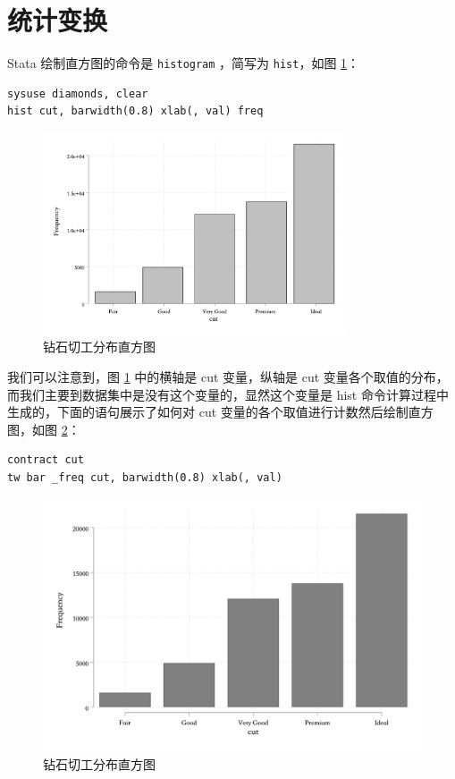 \section{统计变换}

Stata 绘制直方图的命令是 \texttt{histogram} ，简写为 \texttt{hist}，如图 \ref{fig:histcut}：

\begin{lstlisting}
sysuse diamonds, clear
hist cut, barwidth(0.8) xlab(, val) freq
\end{lstlisting}

\begin{figure}[htbp]
  \centering
  \includegraphics[width=0.8\textwidth]{assets/histcut.png}
  \caption{钻石切工分布直方图}\label{fig:histcut}
\end{figure}

我们可以注意到，图 \ref{fig:histcut} 中的横轴是 cut 变量，纵轴是 cut 变量各个取值的分布，而我们主要到数据集中是没有这个变量的，显然这个变量是 hist 命令计算过程中生成的，下面的语句展示了如何对 cut 变量的各个取值进行计数然后绘制直方图，如图 \ref{fig:barcut}：

\begin{lstlisting}
contract cut
tw bar _freq cut, barwidth(0.8) xlab(, val)
\end{lstlisting}

\begin{figure}[htbp]
  \centering
  \includegraphics[width=\textwidth]{assets/barcut.png}
  \caption{钻石切工分布直方图}\label{fig:barcut}
\end{figure}

